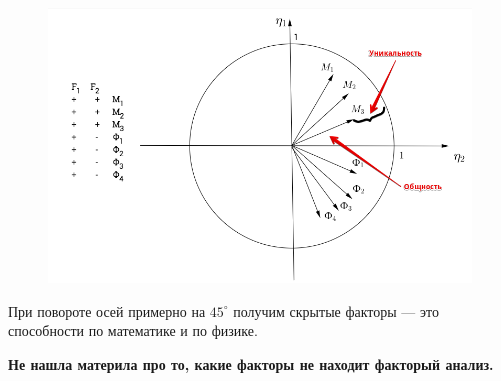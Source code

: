 \begin{ex}

	 \begin{figure}[h!]
	 	\includegraphics[scale=0.65]{img/Example.png}
	 \end{figure}
	
	
	При повороте осей примерно на $45^{\circ}$ получим скрытые факторы --- это способности по математике и по физике.
	
	{\bf{Не нашла материла про то, какие факторы не находит факторый анализ.}}
\end{ex}
